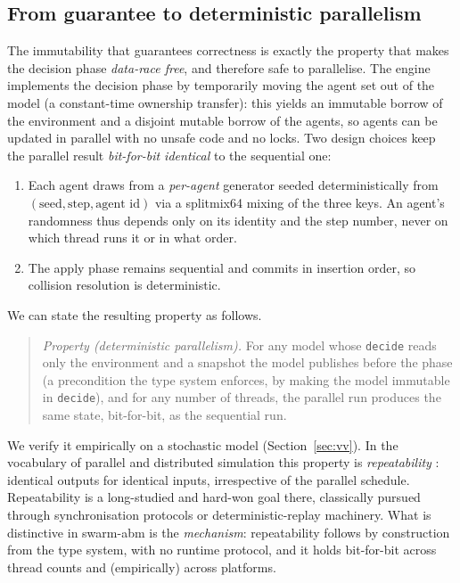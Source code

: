 \documentclass[review]{elsarticle}
\begin{document}
\subsection{From guarantee to deterministic parallelism}
The immutability that guarantees correctness is exactly the property that makes
the decision phase \emph{data-race free}, and therefore safe to parallelise. The
engine implements the decision phase by temporarily moving the agent set out of
the model (a constant-time ownership transfer): this yields an immutable borrow
of the environment and a disjoint mutable borrow of the agents, so agents can be
updated in parallel with no unsafe code and no locks. Two design choices keep
the parallel result \emph{bit-for-bit identical} to the sequential one:
\begin{enumerate}
  \item Each agent draws from a \emph{per-agent} generator seeded
  deterministically from $(\text{seed},\text{step},\text{agent id})$ via a
  splitmix64 mixing of the three keys. An agent's randomness thus depends only
  on its identity and the step number, never on which thread runs it or in
  what order.
  \item The apply phase remains sequential and commits in insertion order, so
  collision resolution is deterministic.
\end{enumerate}
We can state the resulting property as follows.
\begin{quote}
\emph{Property (deterministic parallelism).} For any model whose \texttt{decide}
reads only the environment and a snapshot the model publishes before the phase
(a precondition the type system enforces, by making the model immutable in
\texttt{decide}), and for any number of threads, the parallel run produces the
same state, bit-for-bit, as the sequential run.
\end{quote}
We verify it empirically on a stochastic model (Section~\ref{sec:vv}). In the
vocabulary of parallel and distributed simulation this property is
\emph{repeatability} \cite{fujimoto1990pdes,fujimoto2000pads}: identical outputs
for identical inputs, irrespective of the parallel schedule. Repeatability is a
long-studied and hard-won goal there, classically pursued through
synchronisation protocols or deterministic-replay machinery. What is distinctive
in swarm-abm is the \emph{mechanism}: repeatability follows by construction from
the type system, with no runtime protocol, and it holds bit-for-bit across
thread counts and (empirically) across platforms.
\end{document}
